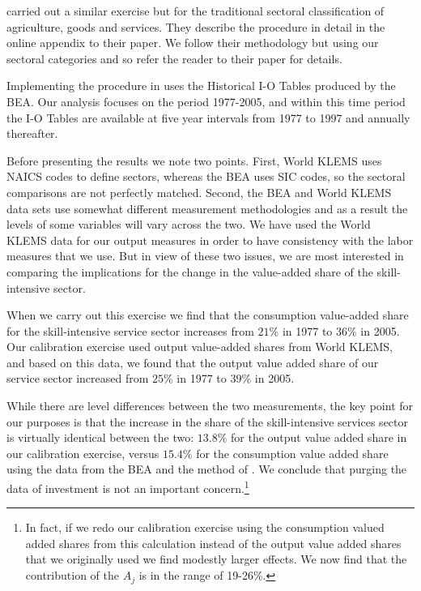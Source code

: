 \documentclass[12pt,english]{article}
\begin{document}
{\normalsize \citet{HRV13} carried out a similar exercise but for the
traditional sectoral classification of agriculture, goods and services. They
describe the procedure in detail in the online appendix to their paper. We
follow their methodology but using our sectoral categories and so refer the
reader to their paper for details. }

{\normalsize Implementing the procedure in \citet{HRV13} uses the Historical
I-O Tables produced by the BEA. Our analysis focuses on the period
1977-2005, and within this time period the I-O Tables are available at five
year intervals from 1977 to 1997 and annually thereafter. }

{\normalsize Before presenting the results we note two points. First, World
KLEMS uses NAICS codes to define sectors, whereas the BEA uses SIC codes, so
the sectoral comparisons are not perfectly matched. Second, the BEA and
World KLEMS data sets use somewhat different measurement methodologies and
as a result the levels of some variables will vary across the two. We have
used the World KLEMS data for our output measures in order to have
consistency with the labor measures that we use. But in view of these two
issues, we are most interested in comparing the implications for the change
in the value-added share of the skill-intensive sector. }

{\normalsize When we carry out this exercise we find that the consumption
value-added share for the skill-intensive service sector increases from $%
21\% $ in 1977 to $36\%$ in 2005. Our calibration exercise used output
value-added shares from World KLEMS, and based on this data, we found that
the output value added share of our service sector increased from $25\%$ in
1977 to $39\%$ in 2005. }

{\normalsize While there are level differences between the two measurements,
the key point for our purposes is that the increase in the share of the
skill-intensive services sector is virtually identical between the two: $%
13.8\%$ for the output value added share in our calibration exercise, versus 
$15.4\%$ for the consumption value added share using the data from the BEA
and the method of \citet{HRV13}. We conclude that purging the data of
investment is not an important concern.\footnote{%
In fact, if we redo our calibration exercise using the consumption valued
added shares from this calculation instead of the output value added shares
that we originally used we find modestly larger effects. We now find that
the contribution of the $A_{j}$ is in the range of 19-26\%.} }
\end{document}
